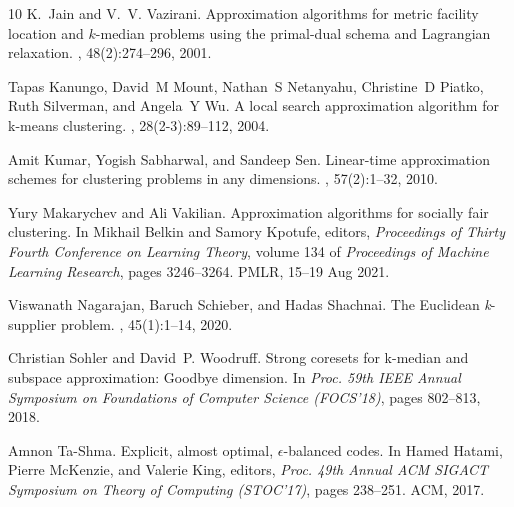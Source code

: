 \documentclass[11pt]{article}
\begin{document}
\begin{thebibliography}{10}
K.~Jain and V.~V. Vazirani.
\newblock Approximation algorithms for metric facility location and $k$-median problems using the primal-dual schema and {L}agrangian relaxation.
, 48(2):274--296, 2001.

Tapas Kanungo, David~M Mount, Nathan~S Netanyahu, Christine~D Piatko, Ruth Silverman, and Angela~Y Wu.
\newblock A local search approximation algorithm for k-means clustering.
, 28(2-3):89--112, 2004.

Amit Kumar, Yogish Sabharwal, and Sandeep Sen.
\newblock Linear-time approximation schemes for clustering problems in any dimensions.
, 57(2):1--32, 2010.

Yury Makarychev and Ali Vakilian.
\newblock Approximation algorithms for socially fair clustering.
\newblock In Mikhail Belkin and Samory Kpotufe, editors, {\em Proceedings of Thirty Fourth Conference on Learning Theory}, volume 134 of {\em Proceedings of Machine Learning Research}, pages 3246--3264. PMLR, 15--19 Aug 2021.

Viswanath Nagarajan, Baruch Schieber, and Hadas Shachnai.
\newblock The {Euclidean} \emph{k}-supplier problem.
, 45(1):1--14, 2020.

Christian Sohler and David~P. Woodruff.
\newblock Strong coresets for k-median and subspace approximation: Goodbye dimension.
\newblock In {\em Proc. 59th {IEEE} Annual Symposium on Foundations of Computer Science (FOCS'18)}, pages 802--813, 2018.

Amnon Ta{-}Shma.
\newblock Explicit, almost optimal, $\epsilon$-balanced codes.
\newblock In Hamed Hatami, Pierre McKenzie, and Valerie King, editors, {\em Proc. 49th Annual {ACM} {SIGACT} Symposium on Theory of Computing (STOC'17)}, pages 238--251. {ACM}, 2017.

\end{thebibliography}
%
\end{document}

